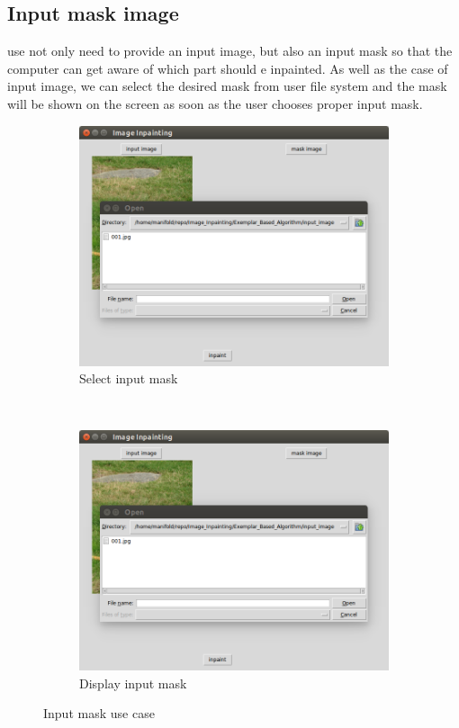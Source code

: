 \subsection{Input mask image}
use not only need to provide an input image, but also an input mask so that the computer can get aware of which part should e inpainted. As well as the case of input image, we can select the desired mask from user file system and the mask will be shown on the screen as soon as the user chooses proper input mask.

\begin{figure}[H]
\centering
\begin{subfigure}{0.45\textwidth}
\includegraphics[width=\textwidth]{ex_mask.png}
\caption{Select input mask}
\end{subfigure}
~
\begin{subfigure}{0.45\textwidth}
\includegraphics[width=\textwidth]{ex_mask.png}
\caption{Display input mask}
\end{subfigure}
\caption{Input mask use case}
\end{figure}


